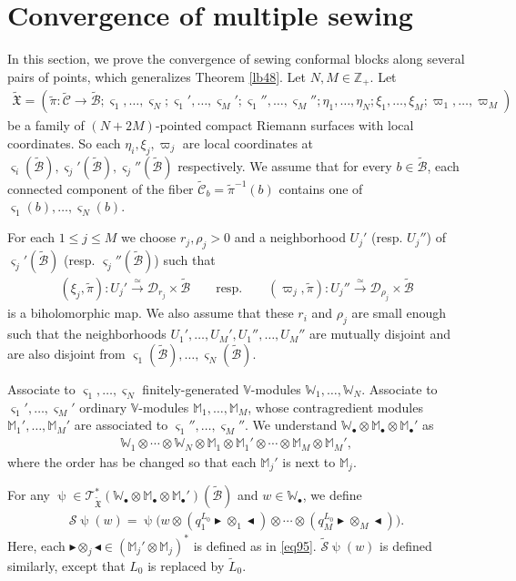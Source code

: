 \documentclass[12pt,a4paper,notitlepage]{article}
\theoremstyle{definition}
\theoremstyle{plain}
\newcommand{\fk}{\mathfrak}
\newcommand{\mc}{\mathcal}
\newcommand{\wtd}{\widetilde}
\newcommand{\scr}{\mathscr}
\newcommand{\sgm}{\varsigma}
\newcommand{\blt}{\bullet}
\newcommand{\Vbb}{\mathbb V}
\newcommand{\Wbb}{\mathbb W}
\newcommand{\Mbb}{\mathbb M}
\newcommand{\Zbb}{\mathbb Z}
\newcommand{\btl}{\blacktriangleleft}
\newcommand{\btr}{\blacktriangleright}
\numberwithin{equation}{section}
\begin{document}
\section{Convergence of multiple sewing}\label{lb56}


In this section, we prove the convergence of sewing conformal blocks along several pairs of points, which generalizes Theorem \ref{lb48}. Let $N,M\in\Zbb_+$. Let
\begin{align*}
\wtd{\fk X}=(\wtd\pi:\wtd{\mc C}\rightarrow\wtd{\mc B};\sgm_1,\dots,\sgm_N;\sgm_1',\dots,\sgm_M';\sgm_1'',\dots,\sgm_M'';\eta_1,\dots,\eta_N;\xi_1,\dots,\xi_M;\varpi_1,\dots,\varpi_M)
\end{align*}
be a family of $(N+2M)$-pointed compact Riemann surfaces with local coordinates. So each $\eta_i,\xi_j,\varpi_j$ are local coordinates at $\sgm_i(\wtd{\mc B}),\sgm_j'(\wtd{\mc B}),\sgm_j''(\wtd{\mc B})$ respectively. We assume that for every $b\in\wtd{\mc B}$, each connected component of the fiber  $\wtd{\mc C}_b=\wtd\pi^{-1}(b)$ contains one of $\sgm_1(b),\dots,\sgm_N(b)$.

For each $1\leq j\leq M$ we choose $r_j,\rho_j>0$ and a neighborhood $U_j'$ (resp. $U_j''$) of $\sgm_j'(\wtd {\mc B})$ (resp. $\sgm_j''(\wtd {\mc B})$) such that
\begin{gather}
(\xi_j,\wtd\pi):U_j'\xrightarrow{\simeq} \mc D_{r_j}\times\wtd{\mc B}\qquad\text{resp.}\qquad (\varpi_j,\wtd\pi):U_j''\xrightarrow{\simeq} \mc D_{\rho_j}\times\wtd{\mc B}\label{eq94}
\end{gather}
is a biholomorphic map. We also assume that these $r_i$ and $\rho_j$ are small enough such that the neighborhoods $U_1',\dots,U_M',U_1'',\dots,U_M''$ are mutually disjoint and are also disjoint from $\sgm_1(\wtd{\mc B}),\dots,\sgm_N(\wtd{\mc B})$. 




Associate to $\sgm_1,\dots,\sgm_N$ finitely-generated $\Vbb$-modules $\Wbb_1,\dots,\Wbb_N$. Associate to $\sgm_1',\dots,\sgm_M'$ ordinary $\Vbb$-modules $\Mbb_1,\dots,\Mbb_M$, whose contragredient modules $\Mbb_1',\dots,\Mbb_M'$ are associated to $\sgm_1'',\dots,\sgm_M''$. We understand $\Wbb_\blt\otimes\Mbb_\blt\otimes\Mbb_\blt'$ as
\begin{align*}
\Wbb_1\otimes\cdots\otimes \Wbb_N\otimes\Mbb_1\otimes\Mbb_1'\otimes\cdots\otimes\Mbb_M\otimes\Mbb_M',
\end{align*}
where the order has be changed so that each $\Mbb_j'$ is next to $\Mbb_j$. 

For any $\uppsi\in\scr T_{\wtd{\fk X}}^*(\Wbb_\blt\otimes\Mbb_\blt\otimes\Mbb_\blt')(\wtd{\mc B})$ and $w\in\Wbb_\blt$, \index{S@$\wtd{\mc S}\uppsi,\mc S\uppsi$} we define   
\begin{align}
\mc S\uppsi(w)=\uppsi\Big(w\otimes (q_1^{ L_0}\btr\otimes_1\btl)\otimes\cdots\otimes (q_M^{ L_0}\btr\otimes_M\btl)\Big).
\end{align}
Here, each $\btr\otimes_j\btl\in(\Mbb_j'\otimes\Mbb_j)^*$ is defined as in \eqref{eq95}. $\wtd{\mc S}\uppsi(w)$ is defined similarly, except that $L_0$ is replaced by $\wtd L_0$.
\end{document}
